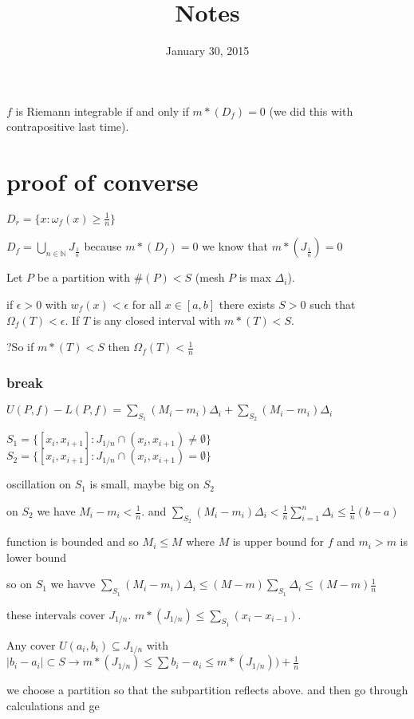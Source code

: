 \documentclass[letterpaper]{article}
\begin{document}
\title{Notes}
\date{January 30, 2015}
\maketitle
$f$ is Riemann integrable if and only if $m*(D_f)=0$ (we did this with contrapositive last time).

\section*{proof of converse}
$D_r=\{x:\omega_f(x)\ge \frac{1}{n}\}$

$D_f=\bigcup_{n\in \mathbb{N}}J_\frac{1}{n}$
because $m*(D_f)=0$ we know that $m*(J_{\frac{1}{n}})=0$

Let $P$ be a partition with $\#(P)<S$ (mesh $P$ is max $\Delta_i$).

if $\epsilon>0$ with $w_f(x)<\epsilon$ for all $x\in[a,b]$ there exists $S>0$ such that $\Omega_f(T)<\epsilon$. If $T$ is any closed interval with $m*(T)<S$.

?So if $m*(T)<S$ then $\Omega_f(T)<\frac{1}{n}$

\subsubsection*{break}
$U(P,f)-L(P,f)=\sum\limits_{S_1}{(M_i-m_i)\Delta_i}+\sum\limits_{S_2}{(M_i-m_i)\Delta_i}$

$S_1=\{[x_i,x_{i+1}]:J_{1/n}\cap(x_i,x_{i+1})\ne \emptyset\}$
$S_2=\{[x_i,x_{i+1}]:J_{1/n}\cap(x_i,x_{i+1})= \emptyset\}$

oscillation on $S_1$ is small, maybe big on $S_2$

on $S_2$ we have $M_i-m_i<\frac{1}{n}$. and $\sum\limits_{S_2}{(M_i-m_i)\Delta_i}< \frac{1}{n}\sum\limits_{i=1}^n{\Delta_i}\le \frac{1}{n}(b-a)$

function is bounded and so $M_i\le M$ where $M$ is upper bound for $f$ and $m_i>m$ is lower bound 

so on $S_1$ we havve $\sum\limits_{S_1}{(M_i-m_i)\Delta_i}\le (M-m)\sum\limits_{S_1}{\Delta_i}\le (M-m)\frac{1}{n}$

these intervals cover $J_{1/n}$. $m*(J_{1/n})\le\sum\limits_{S_1}{(x_i-x_{i-1})}$.

Any cover $U(a_i,b_i)\subseteq J_{1/n}$ with $|b_i-a_i|\subset S\to m*(J_{1/n})\le \sum\limits{b_i-a_i}\le m*(J_{1/n}))+\frac{1}{n}$

we choose a partition so that the subpartition reflects above. and then go through calculations and ge
\end{document}
